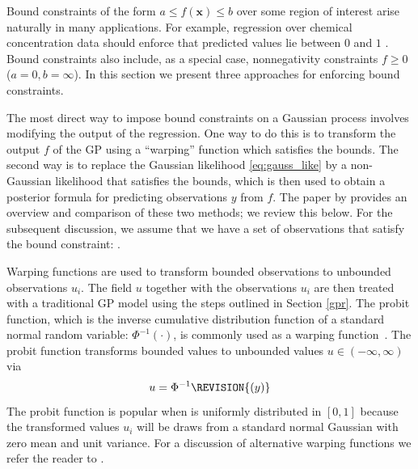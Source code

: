 \label{sec:bound_constraints}
Bound constraints of the form $a \le f(\mathbf{x}) \le b$ over some region of interest arise naturally in many applications. For example, regression over chemical concentration data should enforce that predicted values lie between $0$ and $1$ . Bound constraints also include, as a special case, nonnegativity constraints $f \ge 0$ ($a = 0, b = \infty$). In this section we present three approaches for enforcing bound constraints.

The most direct way to impose bound constraints on a Gaussian process involves modifying the output of the regression. One way to do this is to transform the output $f$ of the GP using a ``warping'' function which satisfies the bounds. The second way is to replace the Gaussian likelihood \eqref{eq:gauss_like} by a non-Gaussian likelihood that satisfies the bounds, which is then used to obtain a posterior formula for predicting observations $y$ from $f$. The paper by  provides an overview and comparison of these two methods; we review this below. For the subsequent discussion, we assume that we have a set of observations  that satisfy the bound constraint: . 
\label{sec:transform_output}

\label{sec:warping_fn}
Warping functions are used to transform bounded observations  to unbounded
observations $u_i$. The field $u$ together with the observations $u_i$ are then treated with a traditional GP model using the steps outlined in Section \ref{gpr}.  The probit function, which is the inverse cumulative distribution function of a standard normal random variable: $\Phi^{-1}(\cdot)$, is commonly used as a warping function~. 
The probit function transforms bounded values  to unbounded values $u\in(-\infty,\infty)$ via
\begin{equation}\label{eq:warping_probit}
u = \Phi^{-1} \REVISION{\left(y\right)}
\end{equation}
The probit function is popular when  is uniformly distributed in $[0,1]$ because the transformed values $u_i$ will be draws from a standard normal Gaussian with zero mean and unit variance. For a discussion of alternative warping functions we refer the reader to .

